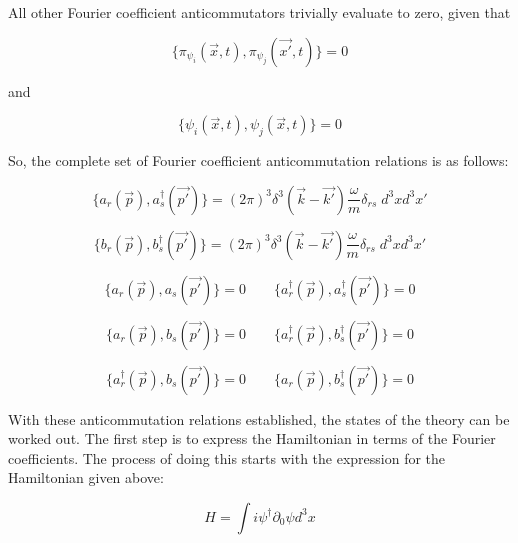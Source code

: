 \documentclass[a4]{article}
\begin{document}
    All other Fourier coefficient anticommutators trivially evaluate to zero, given that

    \begin{equation}
        \{ \pi_{\psi_i} (\vec{x}, t), \pi_{\psi_j} (\vec{x'}, t) \} = 0
    \end{equation} 

    and

    \begin{equation}
        \{ \psi_i (\vec{x}, t), \psi_j (\vec{x}, t) \} = 0
    \end{equation}

    So, the complete set of Fourier coefficient anticommutation relations is as follows:

    \begin{equation}
        \{a_r (\vec{p}), a_s^{\dagger} (\vec{p'})\} = (2 \pi)^3 \delta^3 (\vec{k} - \vec{k'}) \frac{\omega}{m} \delta_{rs} \; d^3 x d^3 x'
    \end{equation}

    \begin{equation}
        \{b_r (\vec{p}), b_s^{\dagger} (\vec{p'})\} = (2 \pi)^3 \delta^3 (\vec{k} - \vec{k'}) \frac{\omega}{m} \delta_{rs} \; d^3 x d^3 x'
    \end{equation}

    \begin{equation}
        \{a_r (\vec{p}), a_s (\vec{p'})\} = 0 \qquad \{a_r^{\dagger} (\vec{p}), a_s^{\dagger} (\vec{p'})\} = 0
    \end{equation}

    \begin{equation}
        \{a_r (\vec{p}), b_s (\vec{p'})\} = 0 \qquad \{a_r^{\dagger} (\vec{p}), b_s^{\dagger} (\vec{p'})\} = 0
    \end{equation}

    \begin{equation}
        \{a_r^{\dagger} (\vec{p}), b_s (\vec{p'})\} = 0 \qquad \{a_r (\vec{p}), b_s^{\dagger} (\vec{p'})\} = 0
    \end{equation}

    With these anticommutation relations established, the states of the theory can be worked out. The first step is to express
    the Hamiltonian in terms of the Fourier coefficients. The process of doing this starts with the expression for the Hamiltonian
    given above:

    \begin{equation}
        H = \int i \psi^{\dagger} \partial_{0} \psi d^3 x
    \end{equation}
\end{document}
